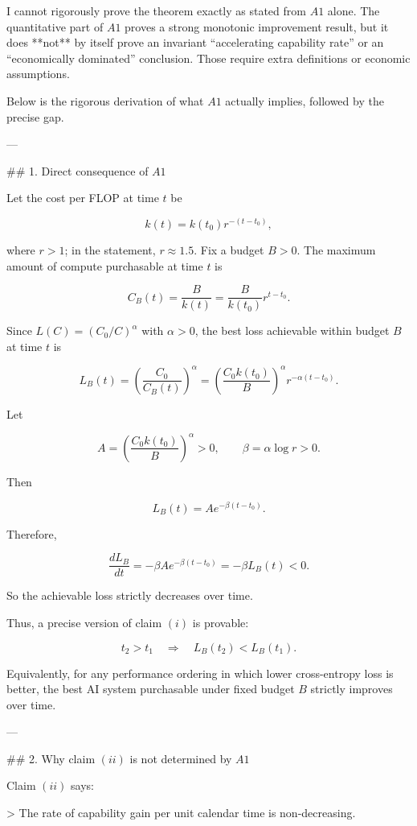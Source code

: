 I cannot rigorously prove the theorem exactly as stated from $A1$ alone. The quantitative part of $A1$ proves a strong monotonic improvement result, but it does **not** by itself prove an invariant “accelerating capability rate” or an “economically dominated” conclusion. Those require extra definitions or economic assumptions.

Below is the rigorous derivation of what $A1$ actually implies, followed by the precise gap.

---

## 1. Direct consequence of $A1$

Let the cost per FLOP at time $t$ be

\[
k(t)=k(t_0)r^{-(t-t_0)},
\]

where $r>1$; in the statement, $r\approx 1.5$. Fix a budget $B>0$. The maximum amount of compute purchasable at time $t$ is

\[
C_B(t)=\frac{B}{k(t)}
      =\frac{B}{k(t_0)}r^{t-t_0}.
\]

Since $L(C)=(C_0/C)^\alpha$ with $\alpha>0$, the best loss achievable within budget $B$ at time $t$ is

\[
L_B(t)
=
\left(\frac{C_0}{C_B(t)}\right)^\alpha
=
\left(\frac{C_0 k(t_0)}{B}\right)^\alpha r^{-\alpha(t-t_0)}.
\]

Let

\[
A=\left(\frac{C_0 k(t_0)}{B}\right)^\alpha>0,
\qquad
\beta=\alpha\log r>0.
\]

Then

\[
L_B(t)=Ae^{-\beta(t-t_0)}.
\]

Therefore,

\[
\frac{dL_B}{dt}
=
-\beta Ae^{-\beta(t-t_0)}
=
-\beta L_B(t)
<0.
\]

So the achievable loss strictly decreases over time.

Thus, a precise version of claim $(i)$ is provable:

\[
t_2>t_1
\quad\Longrightarrow\quad
L_B(t_2)<L_B(t_1).
\]

Equivalently, for any performance ordering in which lower cross-entropy loss is better, the best AI system purchasable under fixed budget $B$ strictly improves over time.

---

## 2. Why claim $(ii)$ is not determined by $A1$

Claim $(ii)$ says:

> The rate of capability gain per unit calendar time is non-decreasing.

